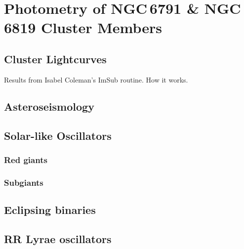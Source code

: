 \chapter{Photometry of NGC\,6791 \& NGC\,6819 Cluster Members}
\label{chap:lightcurves}
\section{Cluster Lightcurves}
Results from Isabel Coleman's ImSub routine. How it works.

\section{Asteroseismology}

\section{Solar-like Oscillators}
\subsection{Red giants}

\subsection{Subgiants}

\section{Eclipsing binaries}

\section{RR Lyrae oscillators}
